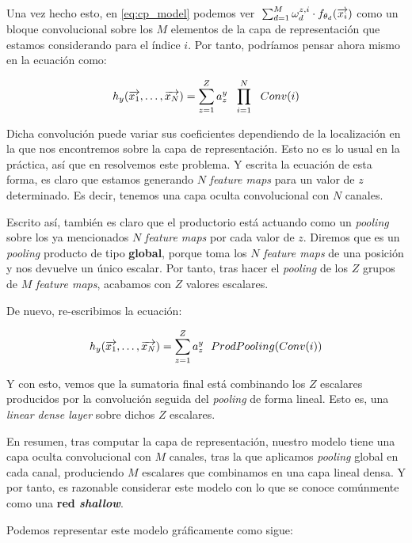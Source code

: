 Una vez hecho esto, en \eqref{eq:cp_model} podemos ver $\; \sum_{d = 1}^{M} \omega^{z, i}_d \cdot f_{\theta_{d}}(\overrightarrow{x_i})$ como un bloque convolucional sobre los $M$ elementos de la capa de representación que estamos considerando para el índice $i$. Por tanto, podríamos pensar ahora mismo en la ecuación como:

\begin{equation}
	h_y(\overrightarrow{x_1}, \ldots, \overrightarrow{x_N}) =  \sum_{z = 1}^Z a_z^y \ \  \prod_{i = 1}^N \ \  Conv(i)
\end{equation}

Dicha convolución puede variar sus coeficientes dependiendo de la localización en la que nos encontremos sobre la capa de representación. Esto no es lo usual en la práctica, así que en  resolvemos este problema. Y escrita la ecuación de esta forma, es claro que estamos generando $N$ \textit{feature maps} para un valor de $z$ determinado. Es decir, tenemos una capa oculta convolucional con $N$ canales.

Escrito así, también es claro que el productorio está actuando como un \textit{pooling} sobre los ya mencionados $N$ \textit{feature maps} por cada valor de $z$. Diremos que es un \textit{pooling} producto de tipo \textbf{global}, porque toma los $N$ \textit{feature maps} de una posición y nos devuelve un único escalar. Por tanto, tras hacer el \textit{pooling} de los $Z$ grupos de $M$ \textit{feature maps}, acabamos con $Z$ valores escalares.

De nuevo, re-escribimos la ecuación:

\begin{equation}
	h_y(\overrightarrow{x_1}, \ldots, \overrightarrow{x_N}) =  \sum_{z = 1}^Z a_z^y \ \  ProdPooling( Conv(i) )
\end{equation}

Y con esto, vemos que la sumatoria final está combinando los $Z$ escalares producidos por la convolución seguida del \textit{pooling} de forma lineal. Esto es, una \textit{linear dense layer} sobre dichos $Z$ escalares.

En resumen, tras computar la capa de representación, nuestro modelo tiene una capa oculta convolucional con $M$ canales, tras la que aplicamos \textit{pooling} global en cada canal, produciendo $M$ escalares que combinamos en una capa lineal densa. Y por tanto, es razonable considerar este modelo con lo que se conoce comúnmente como una \textbf{red \textit{shallow}}.

Podemos representar este modelo gráficamente como sigue:

